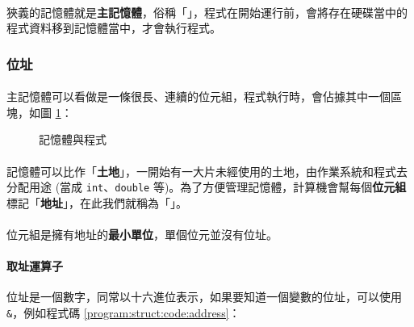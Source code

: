 \documentclass[12pt,a4paper,oneside]{article}
\begin{document}
\begin{CJK}{UTF8}{bkai}
\paragraph{}狹義的記憶體就是\textbf{主記憶體}，俗稱「」，程式在開始運行前，會將存在硬碟當中的程式資料移到記憶體當中，才會執行程式。

\subsubsection{位址}

\paragraph{}主記憶體可以看做是一條很長、連續的位元組，程式執行時，會佔據其中一個區塊，如圖 \ref{program:struct:fig:memory:and:program}：

\begin{figure}[h!]
\centering
{}
\caption{記憶體與程式}
\label{program:struct:fig:memory:and:program}
\end{figure}

\paragraph{}記憶體可以比作「\textbf{土地}」，一開始有一大片未經使用的土地，由作業系統和程式去分配用途 (當成 \lstinline!int!、\lstinline!double! 等)。為了方便管理記憶體，計算機會幫每個{\color{blue}\textbf{位元組}}標記「\textbf{地址}」，在此我們就稱為「」。
\paragraph{}位元組是擁有地址的{\color{blue}\textbf{最小單位}}，單個位元並沒有位址。

\paragraph{取址運算子}位址是一個數字，同常以十六進位表示，如果要知道一個變數的位址，可以使用 \lstinline!&!，例如程式碼 \ref{program:struct:code:address}：


\end{CJK}
\end{document}
